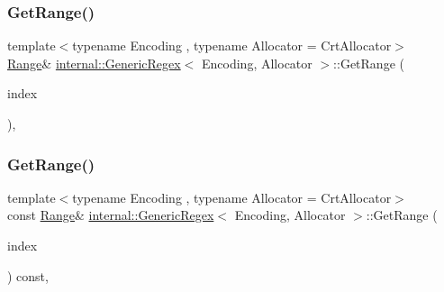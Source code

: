 \mbox{\label{classinternal_1_1GenericRegex_aa81705b924ba862a7b26177a9eabb2af}} 
\subsubsection{\texorpdfstring{Get\+Range()}{GetRange()}\hspace{0.1cm}{\footnotesize\ttfamily [1/2]}}
{\footnotesize\ttfamily template$<$typename Encoding , typename Allocator  = Crt\+Allocator$>$ \\
\hyperlink{structinternal_1_1GenericRegex_1_1Range}{Range}\& \hyperlink{classinternal_1_1GenericRegex}{internal\+::\+Generic\+Regex}$<$ Encoding, Allocator $>$\+::Get\+Range (\begin{DoxyParamCaption}\item[{\hyperlink{rapidjson_8h_a5ed6e6e67250fadbd041127e6386dcb5}{Size\+Type}}]{index }\end{DoxyParamCaption})\hspace{0.3cm}{\ttfamily [inline]}, {\ttfamily [private]}}

\mbox{\label{classinternal_1_1GenericRegex_ae79baed3a6003bd2f4e682f2f07df8a9}} 
\subsubsection{\texorpdfstring{Get\+Range()}{GetRange()}\hspace{0.1cm}{\footnotesize\ttfamily [2/2]}}
{\footnotesize\ttfamily template$<$typename Encoding , typename Allocator  = Crt\+Allocator$>$ \\
const \hyperlink{structinternal_1_1GenericRegex_1_1Range}{Range}\& \hyperlink{classinternal_1_1GenericRegex}{internal\+::\+Generic\+Regex}$<$ Encoding, Allocator $>$\+::Get\+Range (\begin{DoxyParamCaption}\item[{\hyperlink{rapidjson_8h_a5ed6e6e67250fadbd041127e6386dcb5}{Size\+Type}}]{index }\end{DoxyParamCaption}) const\hspace{0.3cm}{\ttfamily [inline]}, {\ttfamily [private]}}

